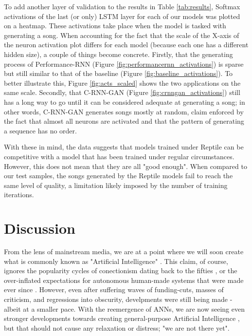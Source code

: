 \documentclass[a4paper]{book}
\begin{document}
To add another layer of validation to the results in Table \ref{tab:results}, Softmax activations of the last (or only) LSTM layer for each of our models was plotted on a heatmap. These activations take place when the model is tasked with generating a song. When accounting for the fact that the scale of the X-axis of the neuron activation plot differs for each model (because each one has a different hidden size), a couple of things become concrete. Firstly, that the generating process of Performance-RNN (Figure \ref{fig:performancernn_activations}) is sparse but still similar to that of the baseline (Figure \ref{fig:baseline_activations}). To better illustrate this, Figure \ref{fig:acts_scaled} shows the two applications on the same scale. Secondly, that C-RNN-GAN (Figure \ref{fig:crnngan_activations}) still has a long way to go until it can be considered adequate at generating a song; in other words, C-RNN-GAN generates songs mostly at random, claim enforced by the fact that almost all neurons are activated and that the pattern of generating a sequence has no order.

With these in mind, the data suggests that models trained under Reptile can be competitive with a model that has been trained under regular circumstances. However, this does not mean that they are all "good enough". When compared to our test samples, the songs generated by the Reptile models fail to reach the same level of quality, a limitation likely imposed by the number of training iterations.

\chapter{Discussion}\label{chap:discussion}

From the lens of mainstream media, we are at a point where we will soon create what is commonly known as "Artificial Intelligence" \parencite{levy_ai_2010}. This claim, of course, ignores the popularity cycles of conectionism dating back to the fifties \parencite[e.g.,][]{rosenblatt_perceptron_1957}, or the over-inflated expectations for autonomous human-made systems that were made ever since \parencite{marcus_is_2012}. However, even after suffering waves of funding-cuts, masses of criticism, and regressions into obscurity, develpments were still being made \parencite{knight_ai_2016, minsky_perceptrons_1988} - albeit at a smaller pace. With the reemergence of ANNs, we are now seeing even stronger developments towards creating general-purpose Artificial Intelligence \parencite[e.g.,][]{vinyals_starcraft_2017}, but that should not cause any relaxation or distress; "we are not there yet".
\end{document}
